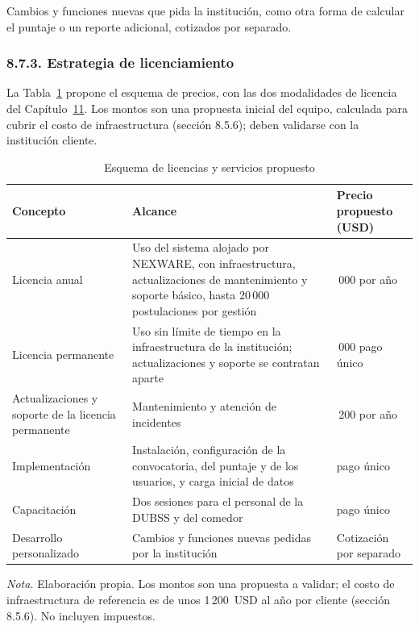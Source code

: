 Cambios y funciones nuevas que pida la institución, como otra forma de calcular el puntaje o un reporte adicional, cotizados por separado.

\subsubsection{8.7.3. Estrategia de licenciamiento}

La Tabla~\ref{tab:licencias_precios} propone el esquema de precios, con las dos modalidades de licencia del Capítulo~\hyperref[cap:puesta_marcha]{11}. Los montos son una propuesta inicial del equipo, calculada para cubrir el costo de infraestructura (sección 8.5.6); deben validarse con la institución cliente.

\begin{table}[H]
\centering
\caption{Esquema de licencias y servicios propuesto}
\label{tab:licencias_precios}
\small
\begin{tabular}{@{}>{\raggedright\arraybackslash}p{3.8cm}>{\raggedright\arraybackslash}p{6.6cm}>{\raggedright\arraybackslash}p{3.2cm}@{}}
\toprule
\textbf{Concepto} & \textbf{Alcance} & \textbf{Precio propuesto (USD)} \\
\midrule
Licencia anual & Uso del sistema alojado por NEXWARE, con infraestructura, actualizaciones de mantenimiento y soporte básico, hasta 20\,000 postulaciones por gestión & 3\,000 por año \\
Licencia permanente & Uso sin límite de tiempo en la infraestructura de la institución; actualizaciones y soporte se contratan aparte & 9\,000 pago único \\
Actualizaciones y soporte de la licencia permanente & Mantenimiento y atención de incidentes & 1\,200 por año \\
Implementación & Instalación, configuración de la convocatoria, del puntaje y de los usuarios, y carga inicial de datos & 800 pago único \\
Capacitación & Dos sesiones para el personal de la DUBSS y del comedor & 400 pago único \\
Desarrollo personalizado & Cambios y funciones nuevas pedidas por la institución & Cotización por separado \\
\bottomrule
\end{tabular}

\vspace{2pt}
\footnotesize\textit{Nota.} Elaboración propia. Los montos son una propuesta a validar; el costo de infraestructura de referencia es de unos 1\,200~USD al año por cliente (sección 8.5.6). No incluyen impuestos.
\end{table}

